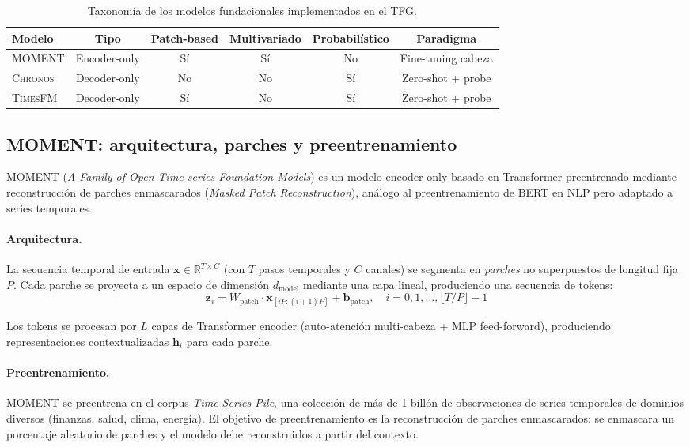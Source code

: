 \documentclass[12pt, a4paper]{article}
\newcommand{\moment}{\textsc{MOMENT}}
\newcommand{\chronos}{\textsc{Chronos}}
\newcommand{\timesfm}{\textsc{TimesFM}}
\begin{document}
\begin{table}[H]
\centering
\caption{Taxonomía de los modelos fundacionales implementados en el TFG.}
\label{tab:taxonomia_modelos}
\small
\begin{tabular}{@{}lccccc@{}}
\toprule
\textbf{Modelo} & \textbf{Tipo} & \textbf{Patch-based} & \textbf{Multivariado} & \textbf{Probabilístico} & \textbf{Paradigma} \\
\midrule
\moment{} & Encoder-only & Sí & Sí & No & Fine-tuning cabeza \\
\chronos{} & Decoder-only & No & No & Sí & Zero-shot + probe \\
\timesfm{} & Decoder-only & Sí & No & Sí & Zero-shot + probe \\
\bottomrule
\end{tabular}
\end{table}


\subsection{MOMENT: arquitectura, parches y preentrenamiento}

\moment{} (\textit{A Family of Open Time-series Foundation Models}) \cite{goswami2024moment} es un modelo encoder-only basado en Transformer preentrenado mediante reconstrucción de parches enmascarados (\textit{Masked Patch Reconstruction}), análogo al preentrenamiento de BERT en NLP pero adaptado a series temporales.

\paragraph{Arquitectura.}
La secuencia temporal de entrada $\mathbf{x} \in \mathbb{R}^{T \times C}$ (con $T$ pasos temporales y $C$ canales) se segmenta en \textit{parches} no superpuestos de longitud fija $P$. Cada parche se proyecta a un espacio de dimensión $d_{\text{model}}$ mediante una capa lineal, produciendo una secuencia de tokens:
\[
\mathbf{z}_i = W_{\text{patch}} \cdot \mathbf{x}_{[iP:(i+1)P]} + \mathbf{b}_{\text{patch}}, \quad i = 0, 1, \ldots, \lfloor T/P \rfloor - 1
\]

Los tokens se procesan por $L$ capas de Transformer encoder (auto-atención multi-cabeza + MLP feed-forward), produciendo representaciones contextualizadas $\mathbf{h}_i$ para cada parche.

\paragraph{Preentrenamiento.}
\moment{} se preentrena en el corpus \textit{Time Series Pile}, una colección de más de 1 billón de observaciones de series temporales de dominios diversos (finanzas, salud, clima, energía). El objetivo de preentrenamiento es la reconstrucción de parches enmascarados: se enmascara un porcentaje aleatorio de parches y el modelo debe reconstruirlos a partir del contexto.
\end{document}
